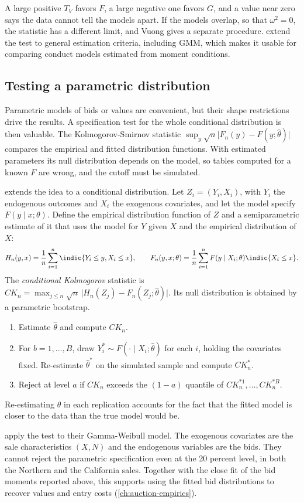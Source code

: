A large positive $T_V$ favors $F$, a large negative one favors $G$, and a value near zero says the data cannot tell the
models apart. If the models overlap, so that $\omega^2 = 0$, the statistic has a different limit, and Vuong gives a separate
procedure. \citet{RiversVuong2002} extend the test to general estimation criteria, including GMM, which makes it usable for
comparing conduct models estimated from moment conditions.

\subsection{Testing a parametric distribution}\label{sec:A-ck-test}

Parametric models of bids or values are convenient, but their shape restrictions drive the results. A specification test
for the whole conditional distribution is then valuable. The Kolmogorov-Smirnov statistic $\sup_y\sqrt{n}\lvert F_n(y) -
F(y;\hat\theta)\rvert$ compares the empirical and fitted distribution functions. With estimated parameters its null
distribution depends on the model, so tables computed for a known $F$ are wrong, and the cutoff must be simulated.

\citet{Andrews1997} extends the idea to a conditional distribution. Let $Z_i = (Y_i, X_i)$, with $Y_i$ the endogenous
outcomes and $X_i$ the exogenous covariates, and let the model specify $F(y \mid x;\theta)$. Define the empirical
distribution function of $Z$ and a semiparametric estimate of it that uses the model for $Y$ given $X$ and the empirical
distribution of $X$:
\begin{equation*}
  H_n(y, x) = \frac{1}{n}\sum_{i=1}^n\indic\{Y_i \le y, X_i \le x\}, \qquad
  F_n(y, x;\theta) = \frac{1}{n}\sum_{i=1}^nF(y \mid X_i;\theta)\indic\{X_i \le x\}.
\end{equation*}
The \emph{conditional Kolmogorov} statistic is $CK_n = \max_{j \le n}\sqrt{n}\,\lvert H_n(Z_j) - F_n(Z_j;\hat\theta)\rvert$. Its
null distribution is obtained by a parametric bootstrap.
\begin{enumerate}
  \item Estimate $\hat\theta$ and compute $CK_n$.
  \item For $b = 1, \dots, B$, draw $Y_i^{*} \sim F(\cdot \mid X_i;\hat\theta)$ for each $i$, holding the covariates fixed.
  Re-estimate $\hat\theta^{*}$ on the simulated sample and compute $CK_n^{*}$.
  \item Reject at level $a$ if $CK_n$ exceeds the $(1 - a)$ quantile of $CK_n^{*1}, \dots, CK_n^{*B}$.
\end{enumerate}
Re-estimating $\theta$ in each replication accounts for the fact that the fitted model is closer to the data than the true
model would be.

\citet[journal p.~241]{AtheyLevinSeira2011} apply the test to their Gamma-Weibull model. The exogenous covariates are the sale
characteristics $(X, N)$ and the endogenous variables are the bids. They cannot reject the parametric specification even at
the 20 percent level, in both the Northern and the California sales. Together with the close fit of the bid moments reported
above, this supports using the fitted bid distributions to recover values and entry costs (\cref{ch:auction-empirics}).
